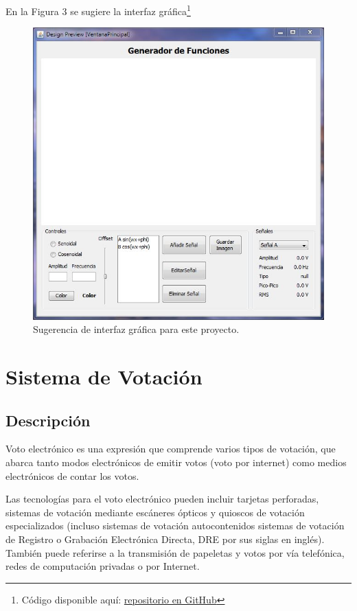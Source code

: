 \documentclass[11pt]{article}
\begin{document}
En la Figura 3 se sugiere la interfaz gráfica\footnote{Código disponible aquí: \href{https://github.com/eduardoschz/LaTex/tree/master/Cursos\%202018-2/GUI/GUI_Proyecto_Generador}{repositorio en GitHub}  }


\begin{figure}[h]
\centering
\includegraphics[scale=0.5]{pics/img_1.JPG} 
\caption{Sugerencia de interfaz gráfica para este proyecto.}
\end{figure}



\section{Sistema de Votación}
\subsection{Descripción}
Voto electrónico es una expresión que comprende varios tipos de votación, que abarca tanto modos electrónicos de emitir votos (voto por internet) como medios electrónicos de contar los votos.

Las tecnologías para el voto electrónico pueden incluir tarjetas perforadas, sistemas de votación mediante escáneres ópticos y quioscos de votación especializados (incluso sistemas de votación autocontenidos sistemas de votación de Registro o Grabación Electrónica Directa, DRE por sus siglas en inglés). También puede referirse a la transmisión de papeletas y votos por vía telefónica, redes de computación privadas o por Internet.
\end{document}

